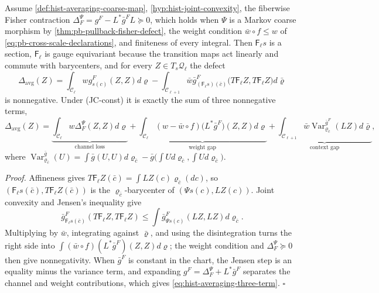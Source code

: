 Assume \cref{def:hist-averaging-coarse-map}, \cref{hyp:hist-joint-convexity},
the fiberwise Fisher contraction
\(\Delta_F^\Psi=g^F-L^*\bar g^FL\succeq0\), which holds when \(\Psi\) is a Markov
coarse morphism by \cref{thm:pb-pullback-fisher-defect}, the weight condition
\(\bar w\circ f\leq w\) of \eqref{eq:pb-cross-scale-declarations}, and finiteness
of every integral. Then \(\mathsf F_\ell s\) is a section, \(\mathsf F_\ell\) is
gauge equivariant because the transition maps act linearly and commute with
barycenters, and for every \(Z\in T_s\mathcal Q_\ell\) the defect
\begin{equation}
\Delta_{\mathrm{avg}}(Z)
=\int_{\mathcal C_\ell}wg^F_{s(c)}(Z,Z)d\varrho
-\int_{\mathcal C_{\ell+1}}\bar w
\bar g^F_{(\mathsf F_\ell s)(\bar c)}
\bigl(T\mathsf F_\ell Z,T\mathsf F_\ell Z\bigr)d\bar\varrho
\label{eq:hist-averaging-defect}
\end{equation}
is nonnegative. Under (JC-const) it is exactly the sum of three nonnegative terms,
\begin{equation}
\Delta_{\mathrm{avg}}(Z)
=\underbrace{\int_{\mathcal C_\ell}w\Delta_F^\Psi(Z,Z)d\varrho}
_{\text{channel loss}}
+\underbrace{\int_{\mathcal C_\ell}(w-\bar w\circ f)
\bigl(L^*\bar g^F\bigr)(Z,Z)d\varrho}_{\text{weight gap}}
+\underbrace{\int_{\mathcal C_{\ell+1}}\bar w
\operatorname{Var}^{\bar g^F}_{\varrho_{\bar c}}(LZ)d\bar\varrho}
_{\text{context gap}},
\label{eq:hist-averaging-three-term}
\end{equation}
where
\(\operatorname{Var}^{\bar g}_{\varrho_{\bar c}}(U)
=\int\bar g(U,U)d\varrho_{\bar c}
-\bar g\bigl(\int Ud\varrho_{\bar c},\int Ud\varrho_{\bar c}\bigr)\).

\noindent\emph{Proof.}
Affineness gives \(T\mathsf F_\ell Z(\bar c)=\int LZ(c)\varrho_{\bar c}(dc)\), so
\((\mathsf F_\ell s(\bar c),T\mathsf F_\ell Z(\bar c))\) is the
\(\varrho_{\bar c}\)-barycenter of \((\Psi s(c),LZ(c))\). Joint convexity and
Jensen's inequality give
\[
\bar g^F_{\mathsf F_\ell s(\bar c)}(T\mathsf F_\ell Z,T\mathsf F_\ell Z)
\leq\int\bar g^F_{\Psi s(c)}(LZ,LZ)d\varrho_{\bar c}.
\]
Multiplying by \(\bar w\),
integrating against \(\bar\varrho\), and using the disintegration turns the
right side into \(\int(\bar w\circ f)(L^*\bar g^F)(Z,Z)d\varrho\); the weight
condition and \(\Delta_F^\Psi\succeq0\) then give nonnegativity. When
\(\bar g^F\) is constant in the chart, the Jensen step is an equality minus the
variance term, and expanding \(g^F=\Delta_F^\Psi+L^*\bar g^F\) separates the
channel and weight contributions, which gives
\eqref{eq:hist-averaging-three-term}. \(\square\)

